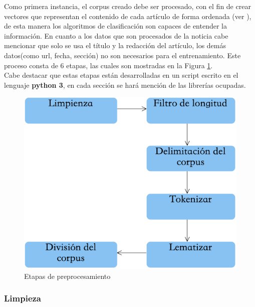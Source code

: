 Como primera instancia, el corpus creado debe ser procesado, con el fin de crear vectores que representan el contenido de cada artículo de forma ordenada (ver ), de esta manera los algoritmos de clasificación son capaces de entender la información. En cuanto a los datos que son procesados de la noticia cabe mencionar que solo se usa el título y la redacción del artículo, los demás datos(como url, fecha, sección) no son necesarios para el entrenamiento. Este proceso consta de 6 etapas, las cuales son mostradas en la Figura \ref{fig:cp5:preprocesamiento}. \\

Cabe destacar que estas etapas están desarrolladas en un script escrito en el lenguaje \textbf{python 3}, en cada sección se hará mención de las librerías ocupadas.\\

\begin{figure}[h]
\centering
\includegraphics[scale=.55]{imagenes/capitulo5/Entrenamiento/preprocesamiento.png}
\caption{Etapas de preprocesamiento}
\label{fig:cp5:preprocesamiento}
\end{figure}

\subsubsection{Limpieza}

